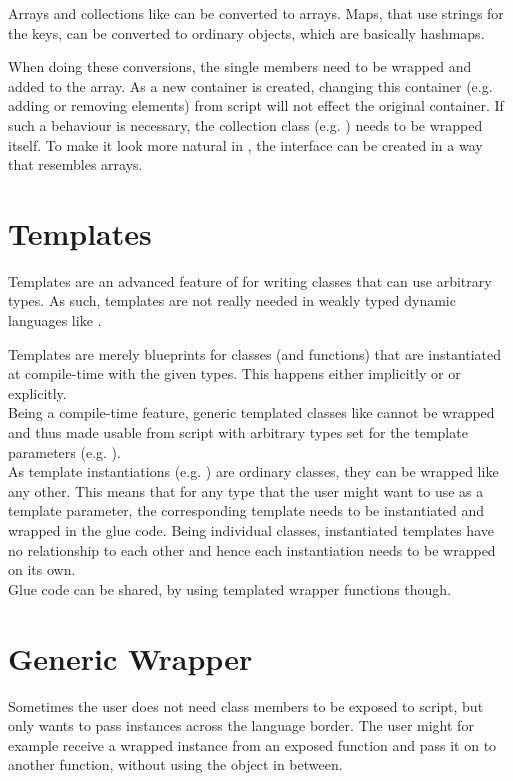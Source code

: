 Arrays and collections like  can be converted to  arrays. Maps, that use strings for the keys, can be converted to ordinary  objects, which are basically hashmaps.

When doing these conversions, the single members need to be wrapped and added to the  array. As a new  container is created, changing this container (e.g. adding or removing elements) from script will not effect the original  container. If such a behaviour is necessary, the collection class (e.g. ) needs to be wrapped itself. To make it look more natural in , the interface can be created in a way that resembles  arrays.

\section{Templates}

Templates are an advanced feature of  for writing classes that can use arbitrary types. As such, templates are not really needed in weakly typed dynamic languages like .

Templates are merely blueprints for classes (and functions) that are instantiated at compile-time with the given types. This happens either implicitly or or explicitly.\\
Being a compile-time feature, generic templated classes like  cannot be wrapped and thus made usable from script with arbitrary types set for the template parameters (e.g. ).\\
As template instantiations (e.g. ) are ordinary classes, they can be wrapped like any other. This means that for any type that the  user might want to use as a template parameter, the corresponding template needs to be instantiated and wrapped in the glue code. Being individual classes, instantiated templates have no relationship to each other and hence each instantiation needs to be wrapped on its own.\\
Glue code can be shared, by using templated wrapper functions though.


\section{Generic Wrapper}
\label{sec:GenericWrapper}
Sometimes the user does not need class members to be exposed to script, but only wants to pass instances across the language border. The user might for example receive a wrapped instance from an exposed  function and pass it on to another  function, without using the  object in between.

